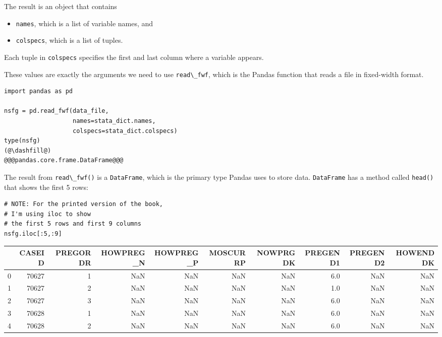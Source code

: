 The result is an object that contains

\begin{itemize}
\item
  \passthrough{\lstinline!names!}, which is a list of variable names,
  and
\item
  \passthrough{\lstinline!colspecs!}, which is a list of tuples.
\end{itemize}

Each tuple in \passthrough{\lstinline!colspecs!} specifies the first and
last column where a variable appears.

These values are exactly the arguments we need to use
\passthrough{\lstinline!read\_fwf!}, which is the Pandas function that
reads a file in fixed-width format.

\begin{lstlisting}[]
import pandas as pd

nsfg = pd.read_fwf(data_file, 
                   names=stata_dict.names, 
                   colspecs=stata_dict.colspecs)
type(nsfg)
(@\dashfill@)
@@@pandas.core.frame.DataFrame@@@
\end{lstlisting}

The result from \passthrough{\lstinline!read\_fwf()!} is a
\passthrough{\lstinline!DataFrame!}, which is the primary type Pandas
uses to store data. \passthrough{\lstinline!DataFrame!} has a method
called \passthrough{\lstinline!head()!} that shows the first 5 rows:

\begin{lstlisting}[]
# NOTE: For the printed version of the book, 
# I'm using iloc to show
# the first 5 rows and first 9 columns 
nsfg.iloc[:5,:9]
\end{lstlisting}

\begin{tabular}{lrrrrrrrrr}
\midrule
{} &  CASEID &  PREGORDR &  HOWPREG\_N &  HOWPREG\_P &  MOSCURRP &  NOWPRGDK &  PREGEND1 &  PREGEND2 &  HOWENDDK \\
\midrule
0 &   70627 &         1 &        NaN &        NaN &       NaN &       NaN &       6.0 &       NaN &       NaN \\
1 &   70627 &         2 &        NaN &        NaN &       NaN &       NaN &       1.0 &       NaN &       NaN \\
2 &   70627 &         3 &        NaN &        NaN &       NaN &       NaN &       6.0 &       NaN &       NaN \\
3 &   70628 &         1 &        NaN &        NaN &       NaN &       NaN &       6.0 &       NaN &       NaN \\
4 &   70628 &         2 &        NaN &        NaN &       NaN &       NaN &       6.0 &       NaN &       NaN \\
\midrule
\end{tabular}

